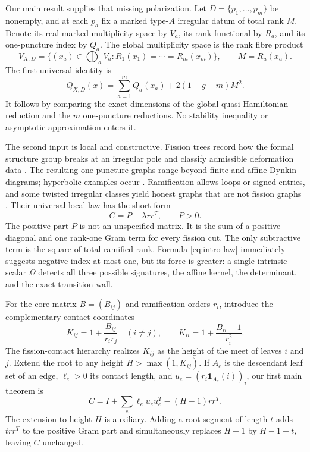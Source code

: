 \documentclass[11pt,a4paper]{amsart}
\theoremstyle{plain}
\theoremstyle{definition}
\newcommand{\one}{\mathbf 1}
\begin{document}
Our main result supplies that missing polarization.  Let $D=\{p_1,\dots,p_m\}$ be nonempty, and
at each $p_a$ fix a marked type-$A$ irregular datum of total rank $M$.  Denote its real marked
multiplicity space by $V_a$, its rank functional by $R_a$, and its one-puncture index by $Q_a$.
The global multiplicity space is the rank fibre product
\begin{equation}\label{eq:intro-fibre-product}
 V_{X,D}=\{(x_a)\in\textstyle\bigoplus_aV_a:R_1(x_1)=\cdots=R_m(x_m)\},
 \qquad M=R_a(x_a).
\end{equation}
The first universal identity is
\begin{equation}\label{eq:intro-fusion}
 \boxed{\quad Q_{X,D}(x)=\sum_{a=1}^mQ_a(x_a)+2(1-g-m)M^2.\quad}
\end{equation}
It follows by comparing the exact dimensions of the global quasi-Hamiltonian reduction and the
$m$ one-puncture reductions.  No stability inequality or asymptotic approximation enters it.

The second input is local and constructive.  Fission trees record how the formal structure group
breaks at an irregular pole and classify admissible deformation data
\cite{Boalch2008Kac,BoalchDoucotRembado2025,Boalch2025Counting}.  The resulting one-puncture graphs
range beyond finite and affine Dynkin diagrams; hyperbolic examples occur
\cite{Boalch2012Simply,Boalch2025Counting}.  Ramification allows loops or signed entries, and some
twisted irregular classes yield honest graphs that are not fission graphs
\cite{Doucot2025Graphs}.  Their universal local law has the short form
\begin{equation}\label{eq:intro-law}
 \boxed{\quad C=P-\lambda rr^T,\qquad P>0.\quad}
\end{equation}
The positive part $P$ is not an unspecified matrix.  It is the sum of a positive diagonal and one
rank-one Gram term for every fission cut.  The only subtractive term is the square of total
ramified rank.  Formula \eqref{eq:intro-law} immediately suggests negative index at most one, but
its force is greater: a single intrinsic scalar $\Omega$ detects all three possible signatures,
the affine kernel, the determinant, and the exact transition wall.

For the core matrix $B=(B_{ij})$ and ramification orders $r_i$, introduce the complementary
contact coordinates
\begin{equation}\label{eq:intro-K}
 K_{ij}=1+\frac{B_{ij}}{r_ir_j}\quad(i\ne j),\qquad
 K_{ii}=1+\frac{B_{ii}-1}{r_i^2}.
\end{equation}
The fission-contact hierarchy realizes $K_{ij}$ as the height of the meet of leaves $i$ and $j$.
Extend the root to any height $H>\max(1,K_{ij})$.  If $A_e$ is the descendant leaf set of an edge,
$\ell_e>0$ its contact length, and $u_e=(r_i\one_{A_e}(i))_i$, our first main theorem is
\begin{equation}\label{eq:intro-factor}
 C=I+\sum_e\ell_eu_eu_e^T-(H-1)rr^T.
\end{equation}
The extension to height $H$ is auxiliary.  Adding a root segment of length $t$ adds $t rr^T$ to
the positive Gram part and simultaneously replaces $H-1$ by $H-1+t$, leaving $C$ unchanged.
\end{document}
